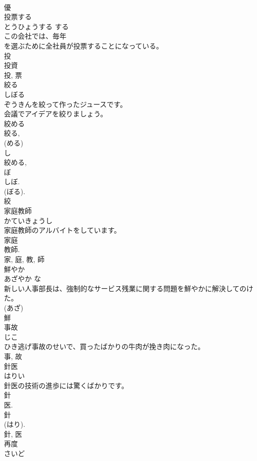\documentclass[8pt]{extreport}
\begin{document}
\begin{CJK}{UTF8}{min}
\\	優	
\\	投票する	
\\	とうひょうする	する 
\\	この会社では、毎年
\\	を選ぶために全社員が投票することになっている。	
\\	投 
\\	投資 
\\	投, 票	
\\	絞る	
\\	しぼる	
\\	ぞうきんを絞って作ったジュースです。	
\\	会議でアイデアを絞りましょう。	
\\	絞める 
\\	絞る, 
\\	(める) 
\\	し 
\\	絞める, 
\\	ぼ 
\\	しぼ. 
\\	(ぼる). 
\\	絞	
\\	家庭教師	
\\	かていきょうし	
\\	家庭教師のアルバイトをしています。	
\\	家庭 
\\	教師. 
\\	家, 庭, 教, 師	
\\	鮮やか	
\\	あざやか	な 
\\	新しい人事部長は、強制的なサービス残業に関する問題を鮮やかに解決してのけた。	
\\	(あざ) 
\\	鮮	
\\	事故	
\\	じこ	
\\	ひき逃げ事故のせいで、買ったばかりの牛肉が挽き肉になった。	
\\	事, 故	
\\	針医	
\\	はりい	
\\	針医の技術の進歩には驚くばかりです。	
\\	針 
\\	医. 
\\	針 
\\	(はり). 
\\	針, 医	
\\	再度	
\\	さいど	

\end{CJK}
\end{document}

